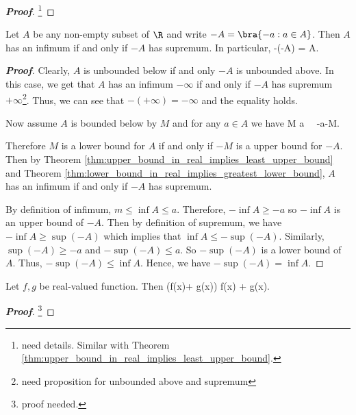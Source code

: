 \begin{proof}[\bf Proof]
\footnote{need details. Similar with Theorem \ref{thm:upper_bound_in_real_implies_least_upper_bound}.}%
\end{proof}


\begin{lemma}\label{lem:supreum_infimum_mirror_relation}%
Let $A$ be any non-empty subset of $\R$ and write $-A =\bra{-a:a\in A}$. Then $A$ has an infimum if and only if $-A$ has supremum. In particular,
\be
-\sup(-A) = \inf A.
\ee
\end{lemma}

\begin{proof}[\bf Proof]%
Clearly, $A$ is unbounded below if and only $-A$ is unbounded above. In this case, we get that $A$ has an infimum $-\infty$ if and only if $-A$ has supremum $+\infty$\footnote{need proposition for unbounded above and supremum}. Thus, we can see that $-(+\infty) = -\infty$ and the equality holds.

Now assume $A$ is bounded below by $M$ and for any $a\in A$ we have
\be
M \leq a \ \lra \ -a\leq -M.
\ee

Therefore $M$ is a lower bound for $A$ if and only if $-M$ is a upper bound for $-A$. Then by Theorem \ref{thm:upper_bound_in_real_implies_least_upper_bound} and Theorem \ref{thm:lower_bound_in_real_implies_greatest_lower_bound}, $A$ has an infimum if and only if $-A$ has supremum.

By definition of infimum, $m\leq \inf A \leq a$. Therefore, $-\inf A \geq -a$ so $-\inf A$ is an upper bound of $-A$. Then by definition of supremum, we have $-\inf A \geq \sup(-A)$ which implies that $\inf A \leq -\sup(-A)$. Similarly, $\sup(-A) \geq -a$ and $-\sup(-A) \leq a$. So $-\sup(-A)$ is a lower bound of $A$. Thus, $-\sup(-A) \leq \inf A$. Hence, we have $-\sup(-A) = \inf A$.
\end{proof}

\begin{proposition}
Let $f,g$ be real-valued function. Then
\be
\sup(f(x)+ g(x)) \leq \sup f(x) + \sup g(x).
\ee
\end{proposition}

\begin{proof}[\bf Proof]
\footnote{proof needed.}
\end{proof}





